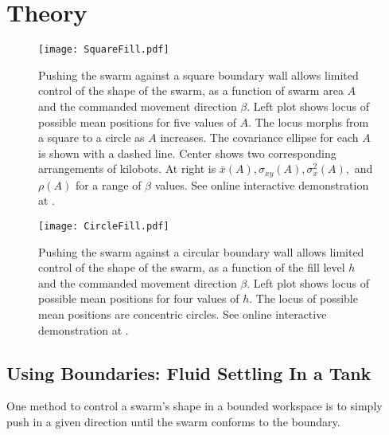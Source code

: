 \section{Theory}
\label{sec:theory}
\begin{figure*}[!htb]
\begin{center}
\texttt{[image: SquareFill.pdf]} 
\vspace{-1em}
\caption{Pushing the swarm against a square boundary wall allows limited control of the shape of the swarm, as a function of swarm area $A$ and the commanded movement direction $\beta$. Left plot shows locus of possible mean positions for five values of $A$.  The locus morphs from a square to a circle as $A$ increases.  The covariance ellipse for each $A$ is shown with a dashed line. Center shows two corresponding arrangements of kilobots.  At right is $\bar{x}(A), \sigma_{xy}(A), \sigma_x^2(A),$ and $\rho(A)$ for a range of $\beta$ values. See online interactive demonstration at \citep{Zhao2016mathematicaSquare}.}
\label{fig:SquareFill}
\end{center}
\end{figure*} 
\begin{figure*}[!htb]
\begin{center}
\vspace{-1em}
\texttt{[image: CircleFill.pdf]} 
\vspace{-1em}
\caption{Pushing the swarm against a circular boundary wall allows limited control of the shape of the swarm, as a function of the fill level $h$ and the commanded movement direction $\beta$. Left plot shows locus of possible mean positions for four values of $h$. The locus of possible mean positions are concentric circles. See online interactive demonstration at \citep{Zhao2016mathematica}.}  
\label{fig:CircleFill}
\end{center}
\end{figure*} 

\subsection{Using Boundaries: Fluid Settling In a Tank}\label{subsec:FluidInTank}
One method to control a swarm's shape in a bounded workspace is to simply push in a given direction until the swarm conforms to the boundary.
